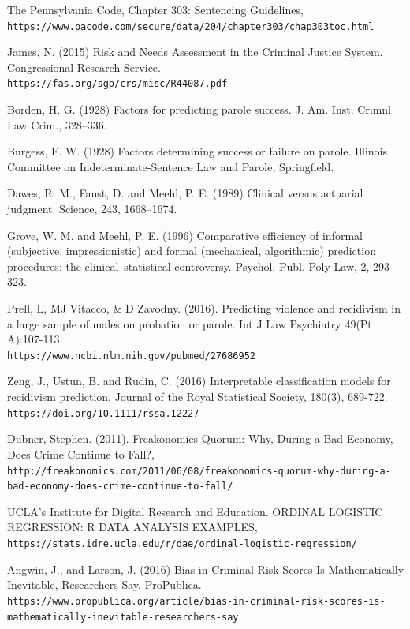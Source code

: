 \documentclass{article}
\begin{document}
\begin{thebibliography}{9}

The Pennsylvania Code, Chapter 303: Sentencing Guidelines,
\\\texttt{https://www.pacode.com/secure/data/204/chapter303/chap303toc.html}

James, N. (2015) Risk and Needs Assessment in the Criminal Justice System. Congressional Research Service.
\\\texttt{https://fas.org/sgp/crs/misc/R44087.pdf}

Borden, H. G. (1928) Factors for predicting parole success. J. Am. Inst. Crimnl Law Crim., 328–336.

Burgess, E. W. (1928) Factors determining success or failure on parole. Illinois Committee on Indeterminate‐Sentence Law and Parole, Springfield.

Dawes, R. M., Faust, D. and Meehl, P. E. (1989) Clinical versus actuarial judgment. Science, 243, 1668–1674.

Grove, W. M. and Meehl, P. E. (1996) Comparative efficiency of informal (subjective, impressionistic) and formal (mechanical, algorithmic) prediction procedures: the clinical–statistical controversy. Psychol. Publ. Poly Law, 2, 293–323.

Prell, L, MJ Vitacco, & D Zavodny. (2016). Predicting violence and recidivism in a large sample of males on probation or parole. Int J Law Psychiatry 49(Pt A):107-113. \\\texttt{https://www.ncbi.nlm.nih.gov/pubmed/27686952}

\pagebreak
{}
Zeng, J., Ustun, B. and Rudin, C. (2016) Interpretable classification models for recidivism prediction. Journal of the Royal Statistical Society, 180(3), 689-722. 
\\\texttt{https://doi.org/10.1111/rssa.12227}

Dubner, Stephen. (2011). Freakonomics Quorum: Why, During a Bad Economy, Does Crime Continue to Fall?,
\\\texttt{http://freakonomics.com/2011/06/08/freakonomics-quorum-why-during-a-bad-economy-does-crime-continue-to-fall/}

 UCLA's Institute for Digital Research and Education. ORDINAL LOGISTIC REGRESSION: R DATA ANALYSIS EXAMPLES,
\\\texttt{https://stats.idre.ucla.edu/r/dae/ordinal-logistic-regression/}

Angwin, J., and Larson, J. (2016) Bias in Criminal Risk Scores Is Mathematically Inevitable, Researchers Say. ProPublica. 
\\\texttt{https://www.propublica.org/article/bias-in-criminal-risk-scores-is-mathematically-inevitable-researchers-say}

\end{thebibliography} 
\end{document}
